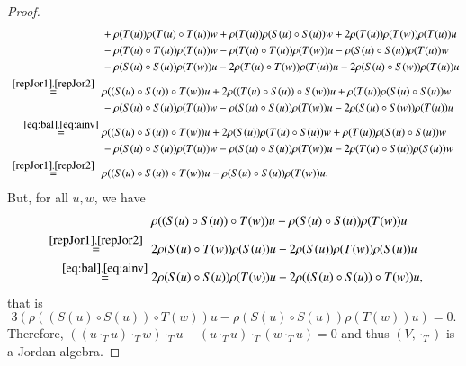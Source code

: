 \documentclass[12pt, reqno, a4paper]{amsart}
\theoremstyle{definition}
\begin{document}
\begin{proof}
\begin{align*}
		& + \rho(T(u)) \rho(T(u) \circ T(u))w + \rho(T(u)) \rho(S(u) \circ S(u) )w + 2 \rho(T(u)) \rho(T(w)) \rho(T(u))u \\
		& - \rho(T(u) \circ T(u)) \rho(T(u))w - \rho(T(u) \circ T(u)) \rho(T(w))u - \rho(S(u) \circ S(u)) \rho(T(u))w \\
		& - \rho(S(u) \circ S(u)) \rho(T(w))u - 2 \rho(T(u) \circ T(w)) \rho(T(u)) u - 2 \rho(S(u) \circ S(w)) \rho(T(u)) u \\
		\overset{\;\;\eqref{repJor1},\eqref{repJor2}\;\;}{=}\; & \rho((S(u) \circ S(u)) \circ T(w)) u + 2 \rho((T(u) \circ S(u)) \circ S(w))u + \rho(T(u)) \rho(S(u) \circ S(u) )w \\
		& - \rho(S(u) \circ S(u)) \rho(T(u))w - \rho(S(u) \circ S(u)) \rho(T(w))u - 2 \rho(S(u) \circ S(w)) \rho(T(u)) u \\
		\overset{\eqref{eq:bal},\eqref{eq:ainv}}{=}\; & \rho((S(u) \circ S(u)) \circ T(w)) u + 2 \rho(S(u))\rho(T(u) \circ S(u)) w + \rho(T(u)) \rho(S(u) \circ S(u) )w \\
		& - \rho(S(u) \circ S(u)) \rho(T(u))w - \rho(S(u) \circ S(u)) \rho(T(w))u - 2 \rho(T(u) \circ S(u)) \rho(S(u))w \\
		\overset{\;\;\eqref{repJor1},\eqref{repJor2}\;\;}{=}\; & \rho((S(u) \circ S(u)) \circ T(w)) u - \rho(S(u) \circ S(u)) \rho(T(w))u.
	\end{align*}
	But, for all $u, w$, we have
	\begin{align*}
		& \rho((S(u) \circ S(u)) \circ T(w)) u - \rho(S(u) \circ S(u)) \rho(T(w))u \\
		\overset{\;\;\eqref{repJor1}, \eqref{repJor2}\;\;}{=}\; & 2 \rho(S(u) \circ T(w)) \rho(S(u)) u - 2 \rho(S(u)) \rho(T(w))\rho(S(u)) u \\
		\overset{\eqref{eq:bal},\eqref{eq:ainv}}{=}\; & 2 \rho(S(u) \circ S(u)) \rho(T(w))u - 2 \rho((S(u) \circ S(u)) \circ T(w))u,
	\end{align*}
	that is 
	\begin{equation*}
		3(\rho((S(u) \circ S(u)) \circ T(w)) u - \rho(S(u) \circ S(u)) \rho(T(w))u) = 0.
	\end{equation*}
	Therefore, $((u \cdot_{T} u) \cdot_{T} w) \cdot_{T} u - (u \cdot_{T} u) \cdot_{T} (w \cdot_{T} u) = 0$ and thus $(V, \cdot_{T})$ is a Jordan algebra.
\end{proof}
\end{document}
